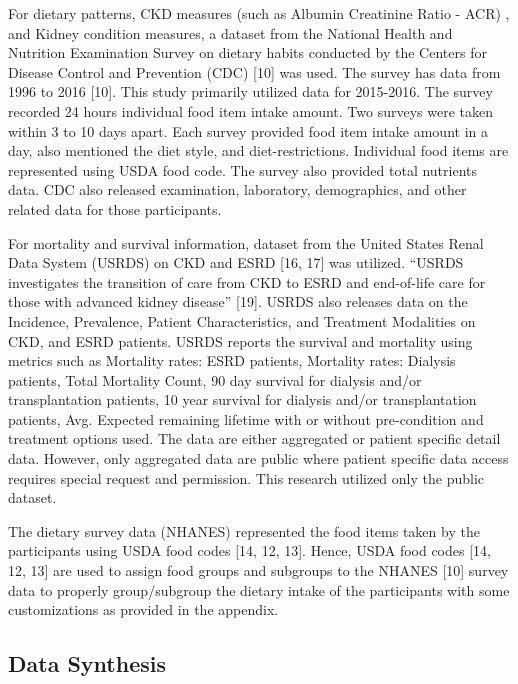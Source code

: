 \medskip 

\noindent For dietary patterns, CKD measures (such as Albumin Creatinine Ratio - ACR) , and Kidney condition measures, a dataset from the National Health and Nutrition Examination Survey on dietary habits conducted by the Centers for Disease Control and Prevention (CDC) [10] was used. The survey has data from 1996 to 2016 [10]. This study primarily utilized data for 2015-2016. The survey recorded 24 hours individual food item intake amount. Two surveys were taken within 3 to 10 days apart. Each survey provided food item intake amount in a day, also mentioned the diet style, and diet-restrictions. Individual food items are represented using USDA food code. The survey also provided total nutrients data. CDC also released examination, laboratory, demographics, and other related data for those participants.

\medskip 
\noindent For mortality and survival information, dataset from the United States Renal Data System (USRDS) on CKD and ESRD [16, 17] was utilized. “USRDS investigates the transition of care from CKD to ESRD and end-of-life care for those with advanced kidney disease” [19]. USRDS also releases data on the Incidence, Prevalence, Patient Characteristics, and Treatment Modalities on CKD, and ESRD patients. USRDS reports the survival and mortality using metrics such as Mortality rates: ESRD patients,  Mortality rates: Dialysis patients, Total Mortality Count, 90 day survival for dialysis and/or transplantation patients, 10 year survival for dialysis and/or transplantation patients, Avg. Expected remaining lifetime with or without pre-condition and treatment options used. The data are either aggregated or patient specific detail data. However, only aggregated data are public where patient specific data access requires special request and permission. This research utilized only the public dataset.


\medskip 
\noindent The dietary survey data (NHANES) represented the food items taken by the participants using USDA food codes [14, 12, 13]. Hence, USDA food codes [14, 12, 13] are used to assign food groups and subgroups to the NHANES [10] survey data to properly group/subgroup the dietary intake of the participants with some customizations as provided in the appendix.

\medskip 
\subsection{Data Synthesis}

